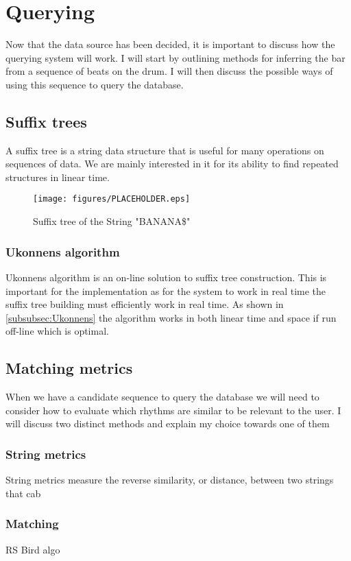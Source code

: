 \documentclass[12pt,twoside,notitlepage]{report}
\begin{document}
	\section{Querying}
	Now that the data source has been decided, it is important to discuss how the querying system will work. I will start by outlining methods for inferring the bar from a sequence of beats on the drum. I will then discuss the possible ways of using this sequence to query the database.
		\subsection{Suffix trees}
		A suffix tree\cite{Weiner1973} is a string data structure that is useful for many operations on sequences of data. We are mainly interested in it for its ability to find repeated structures in linear time\cite{Gusfield1999}.					\begin{figure}[h]
			\centerline{\texttt{[image: figures/PLACEHOLDER.eps]}}
			\caption{\label{SuffixTree} Suffix tree of the String "BANANA\$"}
\end{figure}
		
			\subsubsection{Ukonnens algorithm}
			Ukonnens algorithm\cite{Ukkonen1995} is an on-line solution to suffix tree construction. This is important for the implementation as for the system to work in real time the suffix tree building must efficiently work in real time. As shown in \ref{subsubsec:Ukonnens} the algorithm works in both linear time and space if run off-line which is optimal.
		\subsection{Matching metrics}
		When we have a candidate sequence to query the database we will need to consider how to evaluate which rhythms are similar to be relevant to the user. I will discuss two distinct methods and explain my choice towards one of them 
			\subsubsection{String metrics}
			String metrics measure the reverse similarity, or distance, between two strings that cab 
			
			\subsubsection{Matching}
			RS Bird algo
\end{document}
